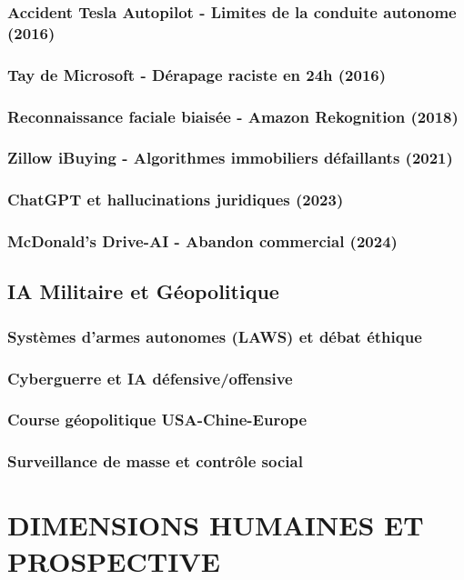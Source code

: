 \documentclass[12pt,a4paper]{book}
\begin{document}
\section{Accident Tesla Autopilot - Limites de la conduite autonome (2016)}
\section{Tay de Microsoft - Dérapage raciste en 24h (2016)}
\section{Reconnaissance faciale biaisée - Amazon Rekognition (2018)}
\section{Zillow iBuying - Algorithmes immobiliers défaillants (2021)}
\section{ChatGPT et hallucinations juridiques (2023)}
\section{McDonald's Drive-AI - Abandon commercial (2024)}

\chapter{IA Militaire et Géopolitique}
\section{Systèmes d'armes autonomes (LAWS) et débat éthique}
\section{Cyberguerre et IA défensive/offensive}
\section{Course géopolitique USA-Chine-Europe}
\section{Surveillance de masse et contrôle social}

\part{DIMENSIONS HUMAINES ET PROSPECTIVE}
\end{document}
